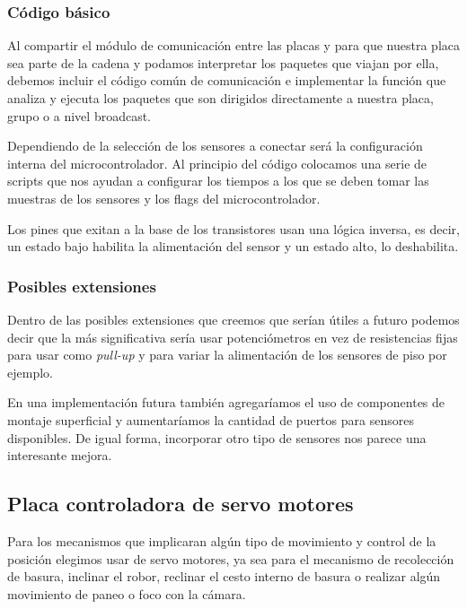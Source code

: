 \subsubsection{C\'odigo b\'asico}
\label{h_placas_sensado_codigo}

Al compartir el m\'odulo de comunicaci\'on entre las placas y para que nuestra placa sea parte de la
cadena y podamos interpretar los paquetes que viajan por ella, debemos incluir el c\'odigo com\'un
de comunicaci\'on e implementar la funci\'on que analiza y ejecuta los paquetes que son dirigidos
directamente a nuestra placa, grupo o a nivel broadcast.

Dependiendo de la selecci\'on de los sensores a conectar ser\'a la configuraci\'on interna del microcontrolador.
Al principio del c\'odigo colocamos una serie de scripts que nos ayudan a configurar los tiempos a los que se
deben tomar las muestras de los sensores y los flags del microcontrolador.

Los pines que exitan a la base de los transistores usan una l\'ogica inversa, es decir, un estado bajo habilita
la alimentaci\'on del sensor y un estado alto, lo deshabilita.

\subsubsection{Posibles extensiones}
\label{h_placas_sensado_extensiones}

Dentro de las posibles extensiones que creemos que ser\'ian \'utiles a futuro podemos decir que la m\'as
significativa ser\'ia usar potenci\'ometros en vez de resistencias fijas para usar como \emph{pull-up} y
para variar la alimentaci\'on de los sensores de piso por ejemplo.

En una implementaci\'on futura tambi\'en agregar\'iamos el uso de componentes de montaje superficial y
aumentar\'iamos la cantidad de puertos para sensores disponibles.
De igual forma, incorporar otro tipo de sensores nos parece una interesante mejora.

\subsection{Placa controladora de servo motores}
\label{h_placas_servos}

Para los mecanismos que implicaran alg\'un tipo de movimiento y control de la posici\'on elegimos usar
de servo motores, ya sea para el mecanismo de recolecci\'on de basura, inclinar el robor, reclinar el
cesto interno de basura o realizar alg\'un movimiento de paneo o foco con la c\'amara.

